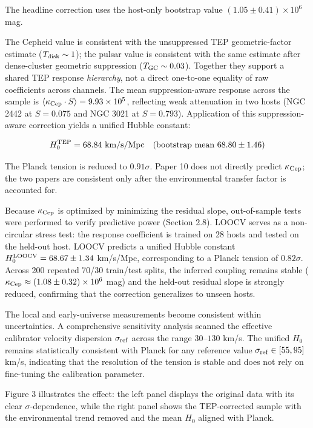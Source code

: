 \documentclass[
]{article}
\begin{document}
The headline correction uses the host-only bootstrap value
\((1.05 \pm 0.41) \times 10^6\) mag.

The Cepheid value is consistent with the unsuppressed TEP
geometric-factor estimate (\(T_{\rm disk} \sim 1\)); the pulsar value is
consistent with the same estimate after dense-cluster geometric
suppression (\(T_{\rm GC} \sim 0.03\)). Together they support a shared
TEP response \emph{hierarchy}, not a direct one-to-one equality of raw
coefficients across channels. The mean suppression-aware response across
the sample is \(\langle \kappa_{\rm Cep} \cdot S
\rangle = 9.93 \times 10^5\), reflecting weak attenuation in two hosts
(NGC 2442 at \(S=0.075\) and NGC 3021 at \(S=0.793\)). Application of
this suppression-aware correction yields a unified Hubble constant:

\begin{equation}
H_0^{\rm TEP} = 68.84 \text{ km/s/Mpc}\quad(\text{bootstrap mean }68.80\pm1.46)
\end{equation}

The Planck tension is reduced to \(0.91\sigma\). Paper 10 does not
directly predict \(\kappa_{\rm Cep}\); the two papers are consistent
only after the environmental transfer factor is accounted for.

Because \(\kappa_{\rm Cep}\) is optimized by minimizing the residual
slope, out-of-sample tests were performed to verify predictive power
(Section 2.8). LOOCV serves as a non-circular stress test: the response
coefficient is trained on 28 hosts and tested on the held-out host.
LOOCV predicts a unified Hubble constant
\(H_0^{\rm LOOCV} = 68.67 \pm 1.34\) km/s/Mpc, corresponding to a Planck
tension of \(0.82\sigma\). Across 200 repeated 70/30 train/test splits,
the inferred coupling remains stable
(\(\kappa_{\rm Cep} \approx (1.08 \pm 0.32)\times10^6\) mag) and the
held-out residual slope is strongly reduced, confirming that the
correction generalizes to unseen hosts.

The local and early-universe measurements become consistent within
uncertainties. A comprehensive sensitivity analysis scanned the
effective calibrator velocity dispersion \(\sigma_{\rm ref}\) across the
range \(30\)--\(130\) km/s. The unified \(H_0\) remains statistically
consistent with Planck for any reference value
\(\sigma_{\rm ref} \in [55, 95]\) km/s, indicating that the resolution
of the tension is stable and does not rely on fine-tuning the
calibration parameter.

Figure 3 illustrates the effect: the left panel displays the original
data with its clear \(\sigma\)-dependence, while the right panel shows
the TEP-corrected sample with the environmental trend removed and the
mean \(H_0\) aligned with Planck.
\end{document}
